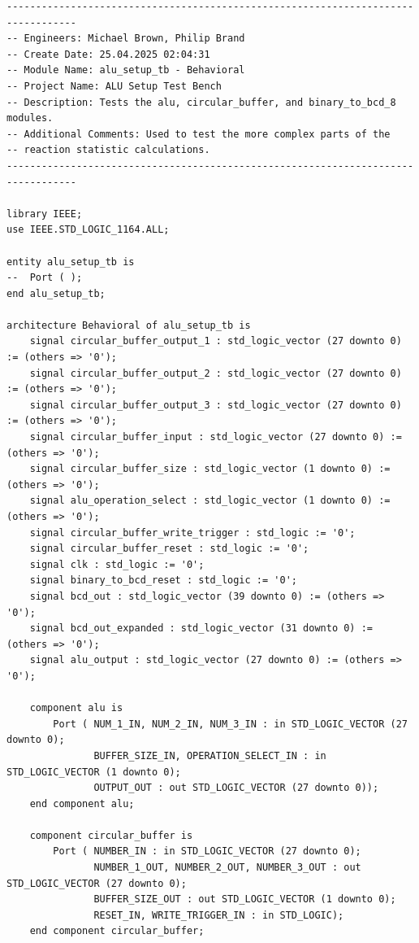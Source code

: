 \documentclass[11pt]{article}
\newenvironment{code}{\captionsetup{type=listing}}{}
\begin{document}
\vspace*{1cm}
\begin{code}
	\begin{verbatim}
----------------------------------------------------------------------------------
-- Engineers: Michael Brown, Philip Brand
-- Create Date: 25.04.2025 02:04:31
-- Module Name: alu_setup_tb - Behavioral
-- Project Name: ALU Setup Test Bench 
-- Description: Tests the alu, circular_buffer, and binary_to_bcd_8 modules.
-- Additional Comments: Used to test the more complex parts of the 
-- reaction statistic calculations.
----------------------------------------------------------------------------------

library IEEE;
use IEEE.STD_LOGIC_1164.ALL;

entity alu_setup_tb is
--  Port ( );
end alu_setup_tb;

architecture Behavioral of alu_setup_tb is
    signal circular_buffer_output_1 : std_logic_vector (27 downto 0) := (others => '0');
    signal circular_buffer_output_2 : std_logic_vector (27 downto 0) := (others => '0');
    signal circular_buffer_output_3 : std_logic_vector (27 downto 0) := (others => '0');
    signal circular_buffer_input : std_logic_vector (27 downto 0) := (others => '0');
    signal circular_buffer_size : std_logic_vector (1 downto 0) := (others => '0');
    signal alu_operation_select : std_logic_vector (1 downto 0) := (others => '0');
    signal circular_buffer_write_trigger : std_logic := '0';
    signal circular_buffer_reset : std_logic := '0';
    signal clk : std_logic := '0';
    signal binary_to_bcd_reset : std_logic := '0';
    signal bcd_out : std_logic_vector (39 downto 0) := (others => '0');
    signal bcd_out_expanded : std_logic_vector (31 downto 0) := (others => '0');
    signal alu_output : std_logic_vector (27 downto 0) := (others => '0');
    
    component alu is
        Port ( NUM_1_IN, NUM_2_IN, NUM_3_IN : in STD_LOGIC_VECTOR (27 downto 0);
               BUFFER_SIZE_IN, OPERATION_SELECT_IN : in STD_LOGIC_VECTOR (1 downto 0);
               OUTPUT_OUT : out STD_LOGIC_VECTOR (27 downto 0));
    end component alu;

    component circular_buffer is
        Port ( NUMBER_IN : in STD_LOGIC_VECTOR (27 downto 0);
               NUMBER_1_OUT, NUMBER_2_OUT, NUMBER_3_OUT : out STD_LOGIC_VECTOR (27 downto 0);
               BUFFER_SIZE_OUT : out STD_LOGIC_VECTOR (1 downto 0);
               RESET_IN, WRITE_TRIGGER_IN : in STD_LOGIC);
    end component circular_buffer;


\end{verbatim}
\end{code}
\end{document}
